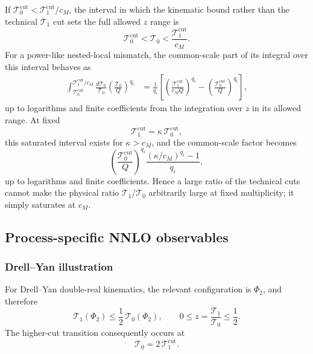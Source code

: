 \documentclass[11pt]{article}
\newcommand{\cut}{\mathrm{cut}}
\newcommand{\Ph}{\Phi}
\begin{document}
If \(\mathcal T_0^{\cut}<\mathcal T_1^{\cut}/c_M\), the interval in which the kinematic bound rather than
the technical \(\mathcal T_1\) cut sets the full allowed \(z\) range is
\begin{equation}
\mathcal T_0^{\cut}
<\mathcal T_0
<\frac{\mathcal T_1^{\cut}}{c_M}.
\label{eq:t1-t0-saturated-interval}
\end{equation}
For a power-like nested-local mismatch, the common-scale part of its integral over this interval behaves as
\begin{align}
\int_{\mathcal T_0^{\cut}}^{\mathcal T_1^{\cut}/c_M}
\frac{d\mathcal T_0}{\mathcal T_0}
\left(\frac{\mathcal T_0}{Q}\right)^{q_i}
&=
\frac{1}{q_i}
\left[
\left(\frac{\mathcal T_1^{\cut}}{c_M Q}\right)^{q_i}
-
\left(\frac{\mathcal T_0^{\cut}}{Q}\right)^{q_i}
\right],
\label{eq:t1-t0-uniform-integrated-region}
\end{align}
up to logarithms and finite coefficients from the integration over \(z\) in its allowed range. At fixed
\begin{equation}
\mathcal T_1^{\cut}
=\kappa\,\mathcal T_0^{\cut},
\label{eq:t1-t0-fixed-kappa}
\end{equation}
this saturated interval exists for \(\kappa>c_M\), and the common-scale factor becomes
\begin{equation}
\left(\frac{\mathcal T_0^{\cut}}{Q}\right)^{q_i}
\frac{(\kappa/c_M)^{q_i}-1}{q_i},
\label{eq:t1-t0-fixed-kappa-scaling}
\end{equation}
up to logarithms and finite coefficients. Hence a large ratio of the technical cuts cannot make the physical
ratio \(\mathcal T_1/\mathcal T_0\) arbitrarily large at fixed multiplicity; it simply saturates at \(c_M\).

\subsection{Process-specific NNLO observables}

\subsubsection{Drell--Yan illustration}
\label{subsubsec:dy-illustration}

For Drell--Yan double-real kinematics, the relevant configuration is \(\Ph_2\), and therefore
\begin{equation}
\mathcal T_1(\Ph_2)
\le\frac{1}{2}\,\mathcal T_0(\Ph_2),
\qquad
0\le z=\frac{\mathcal T_1}{\mathcal T_0}\le\frac12.
\label{eq:dy-t1-t0-bound}
\end{equation}
The higher-cut transition consequently occurs at
\begin{equation}
\mathcal T_0=2\,\mathcal T_1^{\cut}.
\label{eq:dy-t1cut-transition}
\end{equation}
\end{document}
